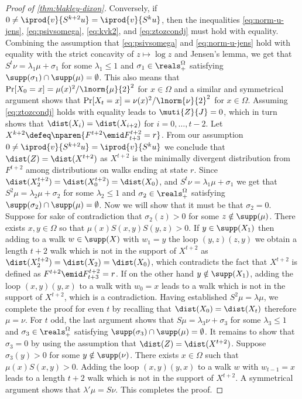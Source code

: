 \begin{proof}[Proof of \autoref{thm:blakley-dixon}]
Conversely, if 
$0\neq \iprod{v}{S^{k+2}u}=\iprod{v}{S^ku}$, then the
inequalities
\eqref{eq:norm-u-jens}, 
\eqref{eq:psivsomega},
\eqref{eq:kvk2},
 and
\eqref{eq:ztozcondj} must hold with equality.
Combining the assumption that \autoref{eq:psivsomega}
and \eqref{eq:norm-u-jens} 
hold with equality with the strict concavity of
$z\mapsto \log z$ and Jensen's lemma, we get that 
$S^t\nu = \lambda_1\mu + \sigma_1$ for some $\lambda_1\le 1$ and $\sigma_1\in\reals^{\Omega}_{+}$ satisfying 
$\supp(\sigma_1)\cap\supp(\mu)=\emptyset$. This also means that $\Pr[X_0 = x] = \mu(x)^2/\lnorm{\mu}{2}^2$ for $x\in \Omega$ and a similar and symmetrical argument shows that
$\Pr[X_t = x] = \nu(x)^2/\lnorm{\nu}{2}^2$ for 
$x\in\Omega$.
Assuming \autoref{eq:ztozcondj} holds 
with equality leads to $\muti{Z}{J}=0$, which in turn
shows that $\dist(X_i)=\dist(X_{i+2})$ for 
$i=0,\ldots,t-2$. 
Let 
$X^{k+2} \defeq \nparen{F^{t+2}\emid F^{t+2}_{t+3}=r}$.
From our assumption $0\neq \iprod{v}{S^{k+2}u}=\iprod{v}{S^ku}$ we conclude that $\dist(Z)=\dist(X^{t+2})$
as $X^{t+2}$ is the minimally divergent distribution from $F^{t+2}$ among distributions on walks ending at state $r$. Since 
$\dist(X^{t+2}_2)=\dist(X^{t+2}_0)=\dist(X_0)$, and $S^t\nu=\lambda_1\mu+\sigma_1$ we get that 
$S^2\mu = \lambda_2 \mu + \sigma_2$  for some $\lambda_2\le 1$ and $\sigma_2\in\reals^{\Omega}_{+}$ satisfying 
$\supp(\sigma_2)\cap\supp(\mu)=\emptyset$. Now we will show that it must be that $\sigma_2=0$. Suppose for sake of contradiction that $\sigma_2(z)>0$ for some $z\notin \supp(\mu)$. There exists $x,y\in\Omega$ so that $\mu(x)S(x,y)S(y,z)>0$. If $y\in\supp(X_1)$ then adding to a walk $w\in \supp(X)$ with $w_1=y$ the loop $(y,z)(z,y)$
we obtain a length $t+2$ walk which is not in the support of $X^{t+2}$ as $\dist(X^{t+2}_2)=\dist(X_2)=\dist(X_0)$,
which contradicts the fact that 
$X^{t+2}$ is defined as $F^{t+2}\emid F^{t+2}_{t+3}=r$.
If on the other hand $y\notin\supp(X_1)$, 
adding the loop $(x,y)(y,x)$ to a walk with $w_0=x$ 
leads to a walk which is not in the support of $X^{t+2}$, 
which is a contradiction. Having established $S^2\mu = \lambda \mu$, we complete the proof for even $t$
by recalling that $\dist(X_0)=\dist(X_t)$ therefore $\mu=\nu$. For $t$ odd, the last argument shows that
 $S\mu = \lambda_3\nu + \sigma_3$ for some $\lambda_3\le 1$ and $\sigma_3\in\reals^{\Omega}_{+}$ satisfying 
$\supp(\sigma_3)\cap\supp(\mu)=\emptyset$. 
It remains to show that $\sigma_3=0$ 
by using the assumption that $\dist(Z)=\dist(X^{t+2})$. Suppose $\sigma_3(y)>0$ for some $y\notin\supp(\nu)$. There exists $x\in\Omega$ such that $\mu(x)S(x,y)>0$. Adding the loop $(x,y)(y,x)$ to
a walk $w$ with $w_{t-1}=x$ leads to a length $t+2$ walk
which is not in the support of $X^{t+2}$. A symmetrical
argument shows that $\lambda'\mu = S\nu$. This completes the proof.
\end{proof}
